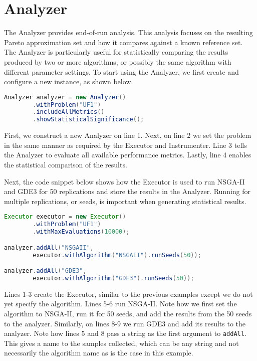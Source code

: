 \section{Analyzer}
The Analyzer provides end-of-run analysis.  This analysis focuses on the resulting Pareto approximation set and how it compares against a known reference set.  The Analyzer is particularly useful for statistically comparing the results produced by two or more algorithms, or possibly the same algorithm with different parameter settings.  To start using the Analyzer, we first create and configure a new instance, as shown below.

\begin{lstlisting}[language=Java]
Analyzer analyzer = new Analyzer()
		.withProblem("UF1")
		.includeAllMetrics()
		.showStatisticalSignificance();
\end{lstlisting}

First, we construct a new Analyzer on line 1.  Next, on line 2 we set the problem in the same manner as required by the Executor and Instrumenter.  Line 3 tells the Analyzer to evaluate all available performance metrics.  Lastly, line 4 enables the statistical comparison of the results.

Next, the code snippet below shows how the Executor is used to run NSGA-II and GDE3 for 50 replications and store the results in the Analyzer.  Running for multiple replications, or seeds, is important when generating statistical results.

\begin{lstlisting}[language=Java]
Executor executor = new Executor()
		.withProblem("UF1")
		.withMaxEvaluations(10000);

analyzer.addAll("NSGAII",  
		executor.withAlgorithm("NSGAII").runSeeds(50));

analyzer.addAll("GDE3",
		executor.withAlgorithm("GDE3").runSeeds(50));
\end{lstlisting}

Lines 1-3 create the Executor, similar to the previous examples except we do not yet specify the algorithm.  Lines 5-6 run NSGA-II.  Note how we first set the algorithm to NSGA-II, run it for 50 seeds, and add the results from the 50 seeds to the analyzer.  Similarly, on lines 8-9 we run GDE3 and add its results to the analyzer.  Note how lines 5 and 8 pass a string as the first argument to \texttt{addAll}.  This gives a name to the samples collected, which can be any string and not necessarily the algorithm name as is the case in this example.

